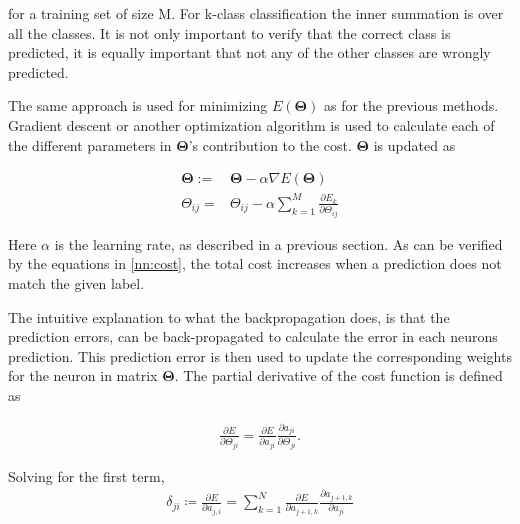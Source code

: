            
            for a training set of size M. For k-class classification the inner summation is over all the classes. It is not only important to verify that the correct class is predicted, it is equally important that not any of the other classes are wrongly predicted.
            
            
            
            
            The same approach is used for minimizing $E(\bm \Theta)$ as for the previous methods. Gradient descent or another optimization algorithm is used to calculate each of the different parameters in $\bm \Theta$'s contribution to the cost. $\bm \Theta$ is updated as 
            
            \begin{align}
                \bm \Theta := & \bm \Theta - \alpha \nabla E(\bm \Theta) \nonumber \\
                \Theta_{ij} = & \Theta_{ij} - \alpha \sum_{k=1}^M \frac{\partial E_k}{\partial \Theta_{ij}} 
                \label{bp:1}
            \end{align}
            
            Here $\alpha$ is the learning rate, as described in a previous section. As can be verified by the equations in \ref{nn:cost}, the total cost increases when a prediction does not match the given label.
            
            
            The intuitive explanation to what the backpropagation does, is that the prediction errors, can be back-propagated to calculate the error in each neurons prediction. This prediction error is then used to update the corresponding weights for the neuron in matrix $\bm \Theta$. The partial derivative of the cost function is defined as
            
            
            \begin{align}
                \frac{\partial E}{\partial \Theta_{ji}} = \frac{\partial E}{\partial a_{ji}} \frac{\partial a_{ji}}{\partial \Theta_{ji}} \label{bp:2}.
            \end{align}
            
            Solving for the first term,
            \begin{align}
                \delta_{ji} \coloneqq \frac{\partial E}{\partial a_{j,i}} = \sum_{k=1}^N \frac{\partial E}{\partial a_{j+1,k}} \frac{\partial a_{j+1,k}}{\partial a_{ji}} \label{bp:3}
            \end{align}
            
